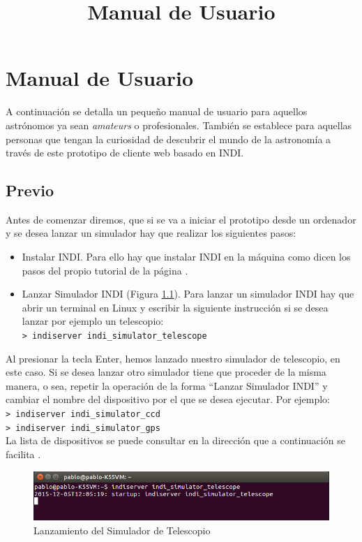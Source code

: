 \chapter{Manual de Usuario}
\title{Manual de Usuario}
\label{cap:ManualDeUsuario}

A continuación se detalla un pequeño manual de usuario para aquellos astrónomos ya sean  \textit{amateurs} o profesionales. También se establece para aquellas personas que tengan la curiosidad de descubrir el mundo de la astronomía a través de este prototipo de cliente web basado en INDI.

\section{Previo}
Antes de comenzar diremos, que si se va a iniciar el prototipo desde un ordenador y se desea lanzar un simulador hay que realizar los siguientes pasos:
\begin{itemize}
  \item Instalar INDI. Para ello hay que instalar INDI en la máquina como dicen los pasos del propio tutorial de la página \cite{InstalarINDI}.
  \item Lanzar Simulador INDI (Figura \ref{fig:INDIServer}). Para lanzar un simulador INDI hay que abrir un terminal en Linux \cite{Linux} y escribir la siguiente instrucción si se desea lanzar por ejemplo un telescopio:\\
  \texttt{> indiserver indi\_simulator\_telescope}
\end{itemize}

Al presionar la tecla Enter, hemos lanzado nuestro simulador de telescopio, en este caso. Si se desea lanzar otro simulador tiene que proceder de la misma manera, o sea, repetir la operación de la forma “Lanzar Simulador INDI” y cambiar el nombre del dispositivo por el que se desea ejecutar. Por ejemplo:\\
\texttt{> indiserver indi\_simulator\_ccd}\\
\texttt{> indiserver indi\_simulator\_gps}\\

La lista de dispositivos se puede consultar en la dirección que a continuación se facilita \cite{ListaDispositivos}.

\begin{figure}[htb]
\centering
\includegraphics[width=1\textwidth]{./imagenes/capturaINDIServer}
\caption{Lanzamiento del Simulador de Telescopio} \label{fig:INDIServer}
\end{figure}

